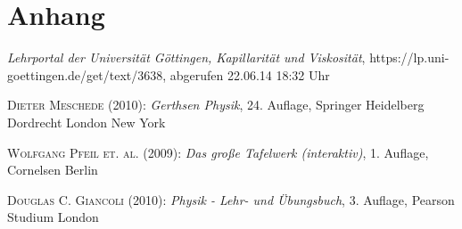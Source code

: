 \documentclass[12pt,a4paper,titlepage,headinclude,bibtotoc]{scrartcl}
\begin{document}
\section{Anhang}
\begin{thebibliography}{9}

	\emph{Lehrportal der Universität Göttingen, Kapillarität und Viskosität},
  https://lp.uni-goettingen.de/get/text/3638, abgerufen 22.06.14 18:32 Uhr

	\textsc{Dieter Meschede} (2010): \emph{Gerthsen Physik}, 24. Auflage, Springer Heidelberg
Dordrecht London New York

	\textsc{Wolfgang Pfeil et. al.} (2009): \emph{Das große Tafelwerk (interaktiv)}, 1. Auflage, Cornelsen Berlin

	\textsc{Douglas C. Giancoli} (2010): \emph{Physik - Lehr- und Übungsbuch}, 3. Auflage, Pearson Studium London
\end{thebibliography}
\end{document}
